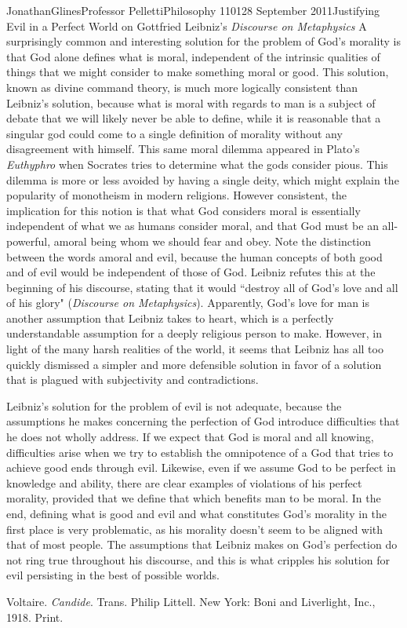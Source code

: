 \documentclass[12pt,letterpaper]{article}
\begin{document}
\begin{mla}{Jonathan}{Glines}{Professor Pelletti}{Philosophy 1101}{28 September 2011}{Justifying Evil in a Perfect World on Gottfried Leibniz's \textit{Discourse on Metaphysics}}
A surprisingly common and interesting solution for the problem of God's morality is that God alone defines what is moral, independent of the intrinsic qualities of things that we might consider to make something moral or good. This solution, known as divine command theory, is much more logically consistent than Leibniz's solution, because what is moral with regards to man is a subject of debate that we will likely never be able to define, while it is reasonable that a singular god could come to a single definition of morality without any disagreement with himself. This same moral dilemma appeared in Plato's \textit{Euthyphro} when Socrates tries to determine what the gods consider pious. This dilemma is more or less avoided by having a single deity, which might explain the popularity of monotheism in modern religions. However consistent, the implication for this notion is that what God considers moral is essentially independent of what we as humans consider moral, and that God must be an all-powerful, amoral being whom we should fear and obey. Note the distinction between the words amoral and evil, because the human concepts of both good and of evil would be independent of those of God. Leibniz refutes this at the beginning of his discourse, stating that it would ``destroy all of God's love and all of his glory" (\textit{Discourse on Metaphysics}). Apparently, God's love for man is another assumption that Leibniz takes to heart, which is a perfectly understandable assumption for a deeply religious person to make. However, in light of the many harsh realities of the world, it seems that Leibniz has all too quickly dismissed a simpler and more defensible solution in favor of a solution that is plagued with subjectivity and contradictions.

Leibniz's solution for the problem of evil is not adequate, because the assumptions he makes concerning the perfection of God introduce difficulties that he does not wholly address. If we expect that God is moral and all knowing, difficulties arise when we try to establish the omnipotence of a God that tries to achieve good ends through evil. Likewise, even if we assume God to be perfect in knowledge and ability, there are clear examples of violations of his perfect morality, provided that we define that which benefits man to be moral. In the end, defining what is good and evil and what constitutes God's morality in the first place is very problematic, as his morality doesn't seem to be aligned with that of most people. The assumptions that Leibniz makes on God's perfection do not ring true throughout his discourse, and this is what cripples his solution for evil persisting in the best of possible worlds.


\begin{workscited}

\bibent
Voltaire.  \textit{Candide}.  Trans. Philip Littell.  New York: Boni and Liverlight, Inc., 1918.  Print.

\end{workscited}
\end{mla}
\end{document}
